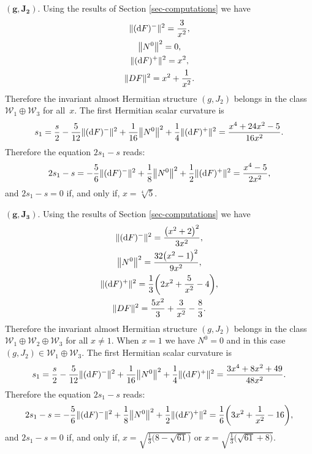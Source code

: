 \documentclass[pdftex]{sigma}%
\numberwithin{equation}{section}
\begin{document}
\medskip\noindent
$\boldsymbol{(g,J_2).}$ Using the results of Section \ref{sec-computations} we have
\begin{gather*}
\|({\rm d}F)^{-}\|^{2}=\dfrac{3}{x^2}, \\
 \big\|N^{0}\big\|^{2}=0, \\
\|({\rm d}F)^{+}\|^{2}=x^{2}, \\
\|DF\|^{2}=x^2+\frac{1}{x^2}.
\end{gather*}
Therefore the invariant almost Hermitian structure $(g,J_2)$ belongs in the class $\mathcal{W}_{1}\oplus \mathcal{W}_{3}$ for all~$x$.
The first Hermitian scalar curvature is
\begin{align*}
s_{1}=\dfrac{s}{2}-\dfrac{5}{12}\|({\rm d}F)^{-}\|^{2}+\dfrac{1}{16}\big\|N^{0}\big\|^{2}+\dfrac{1}{4}\|({\rm d}F)^{+}\|^{2}
=\frac{x^4+24 x^2-5}{16 x^2}.
\end{align*}
Therefore the equation $2s_{1}-s$ reads:
\begin{align*}
2s_{1}-s=-\dfrac{5}{6}\|({\rm d}F)^{-}\|^{2}+\dfrac{1}{8}\big\|N^{0}\big\|^{2}+\dfrac{1}{2}\|({\rm d}F)^{+}\|^{2}
=\frac{x^4-5}{2 x^2},
\end{align*}
and $2s_{1}-s=0$ if, and only if, $x=\sqrt[4]{5}$.

\medskip\noindent
$\boldsymbol{(g,J_{3}).}$ Using the results of Section \ref{sec-computations} we have
\begin{gather*}
\|({\rm d}F)^{-}\|^{2}=\frac{\big(x^2+2\big)^2}{3 x^2}, \\
\big\|N^{0}\big\|^{2}=\frac{32 \big(x^2-1\big)^2}{9 x^2}, \\
\|({\rm d}F)^{+}\|^{2}=\frac{1}{3} \bigg(2 x^2+\frac{5}{x^2}-4\bigg), \\
\|DF\|^{2}=\frac{5 x^2}{3}+\frac{3}{x^2}-\frac{8}{3}.
\end{gather*}
Therefore the invariant almost Hermitian structure $(g,J_2)$ belongs in the class $\mathcal{W}_{1}\oplus \mathcal{W}_{2}\oplus \mathcal{W}_{3}$ for all $x\neq 1$. When $x=1$ we have $N^0=0$ and in this case $(g,J_2)\in \mathcal{W}_{1}\oplus \mathcal{W}_{3} $.
The first Hermitian scalar curvature is
\begin{align*}
s_{1}=\dfrac{s}{2}-\dfrac{5}{12}\|({\rm d}F)^{-}\|^{2}+\dfrac{1}{16}\big\|N^{0}\big\|^{2}+\dfrac{1}{4}\|({\rm d}F)^{+}\|^{2}
=\frac{3 x^4+8 x^2+49}{48 x^2}.
\end{align*}
Therefore the equation $2s_{1}-s$ reads:
\begin{align*}
2s_{1}-s=-\dfrac{5}{6}\|({\rm d}F)^{-}\|^{2}+\dfrac{1}{8}\big\|N^{0}\big\|^{2}+\dfrac{1}{2}\|({\rm d}F)^{+}\|^{2}
=\frac{1}{6} \bigg(3 x^2+\frac{1}{x^2}-16\bigg),
\end{align*}
and $2s_{1}-s=0$ if, and only if, $x=\sqrt{\frac{1}{3} \big(8-\sqrt{61}\big)}$ or $x=\sqrt{\frac{1}{3} \big(\sqrt{61}+8\big)}$.
\end{document}

